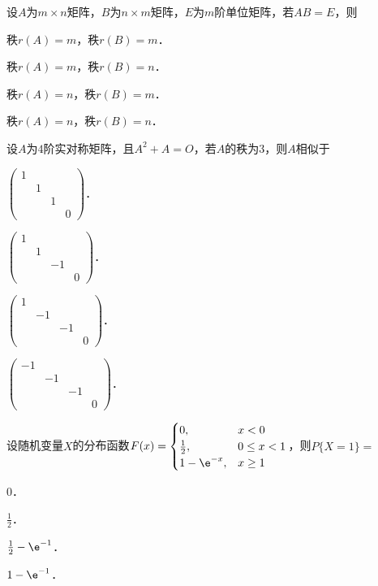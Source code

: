 \documentclass[plain,noanswer,medmath]{../../template/jnuexam}
\begin{document}
\begin{problem}
设$A$为$m \times n$矩阵，$B$为$n \times m$矩阵，$E$为$m$阶单位矩阵，若$AB = E$，则\pickout{}
\begin{abcd}
\item 秩$r(A) = m$，秩$r(B) = m$．
\item 秩$r(A) = m$，秩$r(B) = n$．
\item 秩$r(A) = n$，秩$r(B) = m$．
\item 秩$r(A) = n$，秩$r(B) = n$．
\end{abcd}
\end{problem}


\begin{problem}
设$A$为$4$阶实对称矩阵，且$A^2 + A = O$，若$A$的秩为$3$，则$A$相似于\pickout{}
\begin{abcd}
\item $\begin{pmatrix}
  1 &   &   & \\
    & 1 &   & \\
    &   & 1 & \\
    &   &   & 0
\end{pmatrix}$．
\item $\begin{pmatrix}
  1 &   &    & \\
    & 1 &    & \\
    &   & -1 & \\
    &   &    & 0
\end{pmatrix}$．
\item $\begin{pmatrix}
  1 &    &    & \\
    & -1 &    & \\
    &    & -1 & \\
    &    &    & 0
\end{pmatrix}$．
\item $\begin{pmatrix}
  -1 &    &    & \\
     & -1 &    & \\
     &    & -1 & \\
     &    &    & 0
\end{pmatrix}$．
\end{abcd}
\end{problem}


\begin{problem}
设随机变量$X$的分布函数$F(x) = \begin{cases}
             0, & x < 0 \\
   \frac{1}{2}, & 0 \le x < 1 \\
  1 - \e^{- x}, & x \ge 1
\end{cases}$，则$P\{X = 1\} =$\pickout{}
\begin{abcd}
\item $0$．
\item $\frac{1}{2}$．
\item $\frac{1}{2} - \e^{-1}$．
\item $1 - \e^{-1}$．
\end{abcd}
\end{problem}
\end{document}
